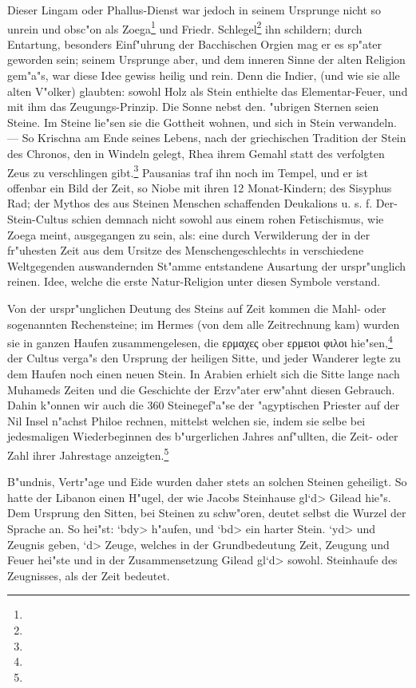 \documentclass[a4paper, 11pt, oneside, polutonikogreek, german]{article}
\begin{document}
Dieser Lingam oder Phallus-Dienst war jedoch in seinem Ursprunge nicht so unrein und obsc"on als Zoega\footnote{} und Friedr. Schlegel\footnote{} ihn schildern; durch Entartung, besonders Einf"uhrung der Bacchischen Orgien mag er es sp"ater geworden sein; seinem Ursprunge aber, und dem inneren Sinne der alten Religion gem"a"s, war diese Idee gewiss heilig und rein. Denn die Indier, (und wie sie alle alten V"olker) glaubten: sowohl Holz als Stein enthielte das Elementar-Feuer, und mit ihm das Zeugungs-Prinzip. Die Sonne nebst den. "ubrigen Sternen seien Steine. Im Steine lie"sen sie die Gottheit wohnen, und sich in Stein verwandeln. --- So Krischna am Ende seines Lebens, nach der griechischen Tradition der Stein des Chronos, den in Windeln gelegt, Rhea ihrem Gemahl statt des verfolgten Zeus zu verschlingen gibt.\footnote{} Pausanias traf ihn noch im Tempel, und er ist offenbar ein Bild der Zeit, so Niobe mit ihren 12 Monat-Kindern; des Sisyphus Rad; der Mythos des aus Steinen Menschen schaffenden Deukalions u. s. f. Der-Stein-Cultus schien demnach nicht sowohl aus einem rohen Fetischismus, wie Zoega meint, ausgegangen zu sein, als: eine durch Verwilderung der in der fr"uhesten Zeit aus dem Ursitze des Menschengeschlechts in verschiedene Weltgegenden auswandernden St"amme entstandene Ausartung der urspr"unglich reinen. Idee, welche die erste Natur-Religion unter diesen Symbole verstand.

Von der urspr"unglichen Deutung des Steins auf Zeit kommen die Mahl- oder sogenannten Rechensteine; im Hermes (von dem alle Zeitrechnung kam) wurden sie in ganzen Haufen zusammengelesen, die ερμαχες ober ερμειοι φιλοι hie"sen,\footnote{} der Cultus verga"s den Ursprung der heiligen Sitte, und jeder Wanderer legte zu dem Haufen noch einen neuen Stein. In Arabien erhielt sich die Sitte lange nach Muhameds Zeiten und die Geschichte der Erzv"ater erw"ahnt diesen Gebrauch. Dahin k"onnen wir auch die 360 Steinegef"a"se der "agyptischen Priester auf der Nil Insel n"achst Philoe rechnen, mittelst welchen sie, indem sie selbe bei jedesmaligen Wiederbeginnen des b"urgerlichen Jahres anf"ullten, die Zeit- oder Zahl ihrer Jahrestage anzeigten.\footnote{}

B"undnis, Vertr"age und Eide wurden daher stets an solchen Steinen geheiligt. So hatte der Libanon einen H"ugel, der wie Jacobs Steinhause \<gl`d> Gilead hie"s. Dem Ursprung den Sitten, bei Steinen zu schw"oren, deutet selbst die Wurzel der Sprache an. So hei"st: \<`bdy> h"aufen, und \<`bd> ein harter Stein. \<`yd> und Zeugnis geben, \<`d> Zeuge, welches in der Grundbedeutung Zeit, Zeugung und Feuer hei"ste und in der Zusammensetzung Gilead \<gl`d> sowohl. Steinhaufe des Zeugnisses, als der Zeit bedeutet.
\end{document}
